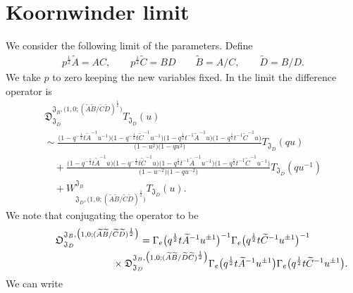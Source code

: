 \documentclass[a4paper,12pt]{article}
\begin{document}
\section{Koornwinder limit}
We consider the following limit of the parameters. Define
\begin{gather}
p^{\frac12} \widetilde A =A C , \qquad p^{\frac12} \widetilde C= B D \qquad \widetilde B=A/C ,\qquad \widetilde D=B/D .
\end{gather}
We take $p$ to zero keeping the new variables fixed. In the limit the difference operator is
\begin{gather*}
{\mathfrak D}_{{\mathfrak J}_D}^{{\mathfrak J}_B,\big(1,0;(\widetilde A \widetilde B/ \widetilde C \widetilde D)^{\frac12}\big)} T_{{\mathfrak J}_D}(u)\\
{} \sim \frac{\big(1-q^{-\frac12}t \widetilde A^{-1}u^{-1}\big)\big(1-q^{-\frac12}t \widetilde C^{-1}u^{-1}\big)\big(1-q^{\frac12} t^{-1} \widetilde A^{-1} u\big)\big(1-q^{\frac12} t^{-1} \widetilde C^{-1} u\big)}{\big(1-u^2\big)\big(1-q u^2\big)} T_{{\mathfrak J}_D}(q u) \\
 \quad{}+\frac{\big(1-q^{-\frac12}t \widetilde A^{-1}u\big)\big(1-q^{-\frac12}t \widetilde C^{-1}u\big)\big(1-q^{\frac12} t^{-1} \widetilde A^{-1} u^{-1}\big)\big(1-q^{\frac12} t^{-1} \widetilde C^{-1} u^{-1}\big)}{\big(1-u^{-2}\big)\big(1-q u^{-2}\big)} T_{{\mathfrak J}_D}(q u^{-1}) \\
\quad{} +W^{{\mathfrak J}_B}_{{\mathfrak J}_D,\big(1,0;(\widetilde A \widetilde B/\widetilde C\widetilde D )^{\frac12}\big)} T_{{\mathfrak J}_D}(u).\end{gather*}
 We note that conjugating the operator to be
\begin{gather*}
{\mathfrak O}_{{\mathfrak J}_D}^{{\mathfrak J}_B,\big(1,0;(\widetilde A \widetilde B / \widetilde C \widetilde D)^{\frac12}\big)}=
\Gamma_e\big(q^{\frac12}t {\widetilde A}^{-1}u^{\pm1}\big)^{-1} \Gamma_e\big(q^{\frac12}t {\widetilde C}^{-1}u^{\pm1}\big)^{-1}\\
 \hphantom{{\mathfrak O}_{{\mathfrak J}_D}^{{\mathfrak J}_B,\big(1,0;(\widetilde A \widetilde B / \widetilde C \widetilde D)^{\frac12}\big)}= }{}
\times {\mathfrak D}_{{\mathfrak J}_D}^{{\mathfrak J}_B,\big(1,0;(\widetilde A \widetilde B / \widetilde D
\widetilde C)^{\frac12}\big)} \Gamma_e\big(q^{\frac12}t {\widetilde A}^{-1}u^{\pm1}\big) \Gamma_e\big(q^{\frac12}t {\widetilde C}^{-1}u^{\pm1}\big) . \end{gather*}
We can write
\end{document}
